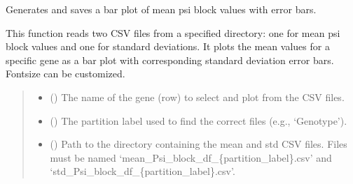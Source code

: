 \documentclass[letterpaper,10pt,english]{sphinxmanual}
\begin{document}

\begin{fulllineitems}
\label{\detokenize{ember_py:ember_py.plots.plot_psi_blocks}}
\pysigstartsignatures
\pysiglinewithargsret
{}
{\sphinxparamcomma {}\sphinxparamcomma {}\sphinxparamcomma {}\sphinxparamcomma {}}
{}
\pysigstopsignatures
\sphinxAtStartPar
Generates and saves a bar plot of mean psi block values with error bars.

\sphinxAtStartPar
This function reads two CSV files from a specified directory: one for mean
psi block values and one for standard deviations. It plots the mean values
for a specific gene as a bar plot with corresponding standard deviation
error bars.
Fontsize can be customized.
\begin{quote}\begin{description}
\begin{itemize}
\item {} 
\sphinxAtStartPar
{} (\sphinxstyleliteralemphasis{\sphinxupquote{, }}) \textendash{} The name of the gene (row) to select and plot from the CSV files.

\item {} 
\sphinxAtStartPar
{} (\sphinxstyleliteralemphasis{\sphinxupquote{, }}) \textendash{} The partition label used to find the correct files (e.g., ‘Genotype’).

\item {} 
\sphinxAtStartPar
{} (\sphinxstyleliteralemphasis{\sphinxupquote{, }}) \textendash{} Path to the directory containing the mean and std CSV files. Files must
be named ‘mean\_Psi\_block\_df\_\{partition\_label\}.csv’ and
‘std\_Psi\_block\_df\_\{partition\_label\}.csv’.


\end{itemize}
\end{description}
\end{quote}
\end{fulllineitems}
\end{document}
